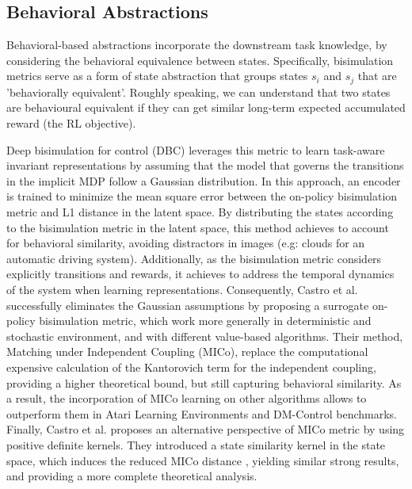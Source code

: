 
\subsection{Behavioral Abstractions}

Behavioral-based abstractions incorporate the downstream task knowledge, by considering the behavioral equivalence between states. Specifically, bisimulation metrics serve as a form of state abstraction that groups states \(s_i\) and \(s_j\) that are 'behaviorally equivalent'. Roughly speaking, we can understand that two states are behavioural equivalent if they can get similar long-term expected accumulated reward (the RL objective). %

Deep bisimulation for control (DBC) \cite{zhang2020learning} leverages this metric to learn task-aware invariant representations by assuming that the model that governs the transitions in the implicit MDP follow a Gaussian distribution. In this approach, an encoder is trained to minimize the mean square error between the on-policy bisimulation metric and L1 distance in the latent space. By distributing the states according to the bisimulation metric in the latent space, this method achieves to account for behavioral similarity, avoiding distractors in images (e.g: clouds for an automatic driving system). Additionally, as the bisimulation metric considers explicitly transitions and rewards, it achieves to address the temporal dynamics of the system when learning representations. Consequently, Castro et al. \cite{castro2021mico} successfully eliminates the Gaussian assumptions by proposing a surrogate on-policy bisimulation metric, which work more generally in deterministic and stochastic environment, and with different value-based algorithms. Their method, Matching under Independent Coupling (MICo), replace the computational expensive calculation of the Kantorovich term for the independent coupling, providing a higher theoretical bound, but still capturing behavioral similarity. As a result, the incorporation of MICo learning on other algorithms allows to outperform them in Atari Learning Environments and DM-Control benchmarks. Finally, Castro et al. \cite{castro2023kernel} proposes an alternative perspective of MICo metric by using positive definite kernels. They introduced a state similarity kernel in the state space, which induces the reduced MICo distance \cite{castro2021mico}, yielding similar strong results, and providing a more complete theoretical analysis.


